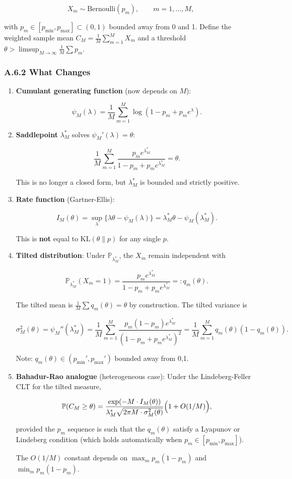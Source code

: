 \documentclass[
  12pt,
]{article}
\begin{document}
\[X_m \sim \text{Bernoulli}(p_m), \qquad m = 1,\ldots,M,\]

with \(p_m \in [p_{\min}, p_{\max}] \subset (0,1)\) bounded away from 0
and 1. Define the weighted sample mean
\(C_M = \frac{1}{M}\sum_{m=1}^M X_m\) and a threshold
\(\theta > \limsup_{M\to\infty} \frac{1}{M}\sum p_m\).

\subsubsection{A.6.2 What Changes}\label{a.6.2-what-changes}

\begin{enumerate}
\def\labelenumi{\arabic{enumi}.}
\item
  \textbf{Cumulant generating function} (now depends on \(M\)):

  \[\psi_M(\lambda) = \frac{1}{M}\sum_{m=1}^M \log(1-p_m + p_m e^\lambda).\]
\item
  \textbf{Saddlepoint} \(\lambda_M^*\) solves
  \(\psi_M'(\lambda) = \theta\):

  \[\frac{1}{M}\sum_{m=1}^M \frac{p_m e^{\lambda_M^*}}{1-p_m + p_m e^{\lambda_M^*}} = \theta.\]

  This is no longer a closed form, but \(\lambda_M^*\) is bounded and
  strictly positive.
\item
  \textbf{Rate function} (Gartner-Ellis):

  \[I_M(\theta) = \sup_\lambda\{\lambda\theta - \psi_M(\lambda)\}
  = \lambda_M^*\theta - \psi_M(\lambda_M^*).\]

  This is \textbf{not} equal to \(\text{KL}(\theta\|p)\) for any single
  \(p\).
\item
  \textbf{Tilted distribution}: Under \(\mathbb{P}_{\lambda_M^*}\), the
  \(X_m\) remain independent with

  \[\mathbb{P}_{\lambda_M^*}(X_m=1) = \frac{p_m e^{\lambda_M^*}}{1-p_m + p_m e^{\lambda_M^*}} =: q_m(\theta).\]

  The tilted mean is \(\frac{1}{M}\sum q_m(\theta) = \theta\) by
  construction. The tilted variance is

  \[\sigma_M^2(\theta) = \psi_M''(\lambda_M^*) = \frac{1}{M}\sum_{m=1}^M
  \frac{p_m(1-p_m)e^{\lambda_M^*}}{(1-p_m + p_m e^{\lambda_M^*})^2}
  = \frac{1}{M}\sum_{m=1}^M q_m(\theta)(1-q_m(\theta)).\]

  Note: \(q_m(\theta) \in (p_{\min}', p_{\max}')\) bounded away from
  0,1.
\item
  \textbf{Bahadur-Rao analogue} (heterogeneous case): Under the
  Lindeberg-Feller CLT for the tilted measure,

  \[\mathbb{P}(C_M \geq \theta) = \frac{\exp(-M \cdot I_M(\theta))}
  {\lambda_M^* \sqrt{2\pi M \cdot \sigma_M^2(\theta)}}
  \Bigl(1 + O(1/M)\Bigr),\]

  provided the \(p_m\) sequence is such that the \(q_m(\theta)\) satisfy
  a Lyapunov or Lindeberg condition (which holds automatically when
  \(p_m \in [p_{\min}, p_{\max}]\)).

  The \(O(1/M)\) constant depends on \(\max_m p_m(1-p_m)\) and
  \(\min_m p_m(1-p_m)\).
\end{enumerate}
\end{document}
